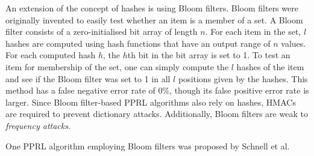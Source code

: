 An extension of the concept of hashes is using Bloom filters. %
Bloom filters were originally invented to easily test whether an item is a member of a set.
A Bloom filter consists of a zero-initialised bit array of length $n$.
For each item in the set, $l$ hashes are computed using hash functions that have an output range of $n$ values.
For each computed hash $h$, the $h$th bit in the bit array is set to 1.
To test an item for membership of the set, one can simply compute the $l$ hashes of the item and see if the Bloom filter was set to 1 in all $l$ positions given by the hashes.
This method has a false negative error rate of 0\%, though its false positive error rate is larger.
Since Bloom filter-based \ac{PPRL} algorithms also rely on hashes, \ac{HMAC}s are required to prevent dictionary attacks.
Additionally, Bloom filters are weak to \textit{frequency attacks}. %

One \ac{PPRL} algorithm employing Bloom filters was proposed by Schnell et al. %

